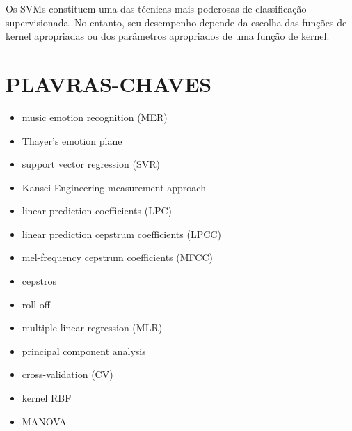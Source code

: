 \documentclass{article}
\begin{document}
Os SVMs constituem uma das técnicas mais poderosas de classificação supervisionada. No entanto, seu desempenho depende da escolha das funções de kernel apropriadas ou dos parâmetros apropriados de uma função de kernel.

\section{PLAVRAS-CHAVES}
\begin{itemize}
    \item music emotion recognition (MER)
    \item Thayer’s emotion plane
    \item support vector regression (SVR)
    \item Kansei Engineering measurement approach
    \item linear prediction coefficients (LPC)
    \item linear prediction cepstrum coefficients (LPCC)
    \item mel-frequency cepstrum coefficients (MFCC)
    \item cepstros
    \item roll-off
    \item multiple linear regression (MLR)
    \item principal component analysis
    \item cross-validation (CV)
    \item kernel RBF
    \item MANOVA
\end{itemize}
\end{document}
